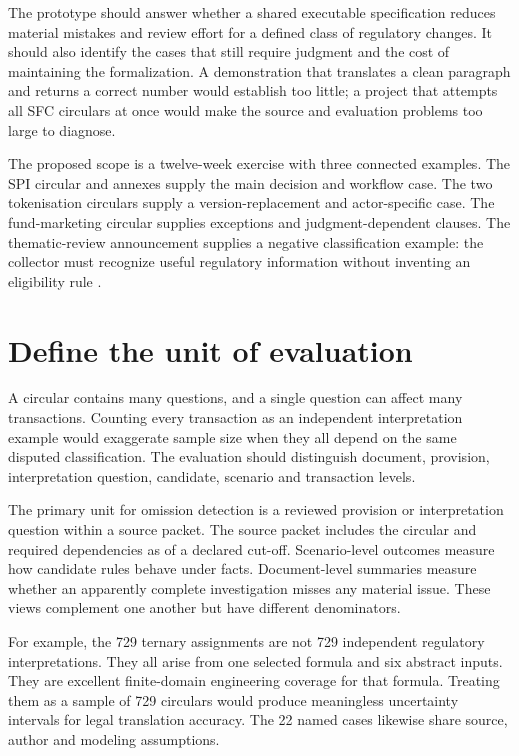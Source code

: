 \label{sec:prototype}

The prototype should answer whether a shared executable specification reduces
material mistakes and review effort for a defined class of regulatory changes.
It should also identify the cases that still require judgment and the cost of
maintaining the formalization. A demonstration that translates a clean paragraph
and returns a correct number would establish too little; a project that attempts
all SFC circulars at once would make the source and evaluation problems too large
to diagnose.

The proposed scope is a twelve-week exercise with three connected examples. The
SPI circular and annexes supply the main decision and workflow case. The two
tokenisation circulars supply a version-replacement and actor-specific case.
The fund-marketing circular supplies exceptions and judgment-dependent clauses.
The thematic-review announcement supplies a negative classification example:
the collector must recognize useful regulatory information without inventing an
eligibility rule \citep{sfcspi,sfctoken2023,sfctoken2026,sfcmarketing,sfcreview2025}.


\section{Define the unit of evaluation}
\label{merge:M09:01}


A circular contains many questions, and a single question can affect many
transactions. Counting every transaction as an independent interpretation example
would exaggerate sample size when they all depend on the same disputed
classification. The evaluation should distinguish document, provision,
interpretation question, candidate, scenario and transaction levels.

The primary unit for omission detection is a reviewed provision or interpretation
question within a source packet. The source packet includes the circular and
required dependencies as of a declared cut-off. Scenario-level outcomes measure
how candidate rules behave under facts. Document-level summaries measure whether
an apparently complete investigation misses any material issue. These views
complement one another but have different denominators.


For example, the 729 ternary assignments are not 729 independent regulatory
interpretations. They all arise from one selected formula and six abstract inputs.
They are excellent finite-domain engineering coverage for that formula. Treating
them as a sample of 729 circulars would produce meaningless uncertainty intervals
for legal translation accuracy. The 22 named cases likewise share source,
author and modeling assumptions.

